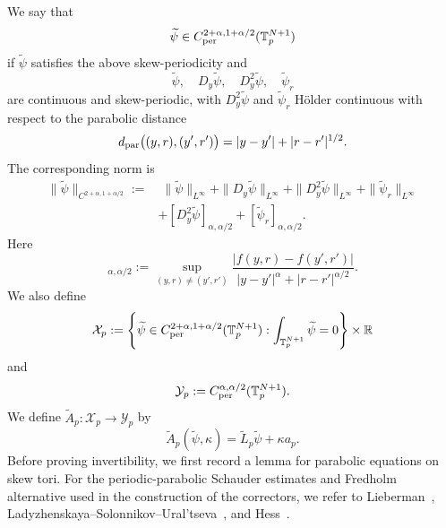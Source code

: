 \documentclass[preprint]{elsarticle}
\numberwithin{equation}{section}
\begin{document}
We say that
$$
\widetilde\psi\in C_{\rm per}^{2+\alpha,1+\alpha/2}(\mathbb T_p^{N+1})
$$
if $\widetilde\psi$ satisfies the above skew-periodicity and
$$
\widetilde\psi,\quad D_y\widetilde\psi,\quad D_y^2\widetilde\psi,\quad \widetilde\psi_r
$$
are continuous and skew-periodic, with $D_y^2\widetilde\psi$ and $\widetilde\psi_r$ Hölder continuous with respect to the parabolic distance
$$
d_{\rm par}\bigl((y,r),(y',r')\bigr)
=
|y-y'|+|r-r'|^{1/2}.
$$
The corresponding norm is
\begin{equation*}
\begin{aligned}
\|\widetilde\psi\|_{C^{2+\alpha,1+\alpha/2}}
:=
&\;
\|\widetilde\psi\|_{L^\infty}
+
\|D_y\widetilde\psi\|_{L^\infty}
+
\|D_y^2\widetilde\psi\|_{L^\infty}
+
\|\widetilde\psi_r\|_{L^\infty}
\\
&+
[D_y^2\widetilde\psi]_{\alpha,\alpha/2}
+
[\widetilde\psi_r]_{\alpha,\alpha/2}.
\end{aligned}
\end{equation*}
Here
\begin{equation*}
[f]_{\alpha,\alpha/2}
:=
\sup_{(y,r)\ne(y',r')}
\frac{|f(y,r)-f(y',r')|}
{|y-y'|^\alpha+|r-r'|^{\alpha/2}}.
\end{equation*}
We also define
\begin{equation*}
\mathcal X_p
:=
\left\{
\widetilde\psi\in
C_{\rm per}^{2+\alpha,1+\alpha/2}(\mathbb T_p^{N+1}):
\int_{\mathbb T_p^{N+1}}\widetilde\psi=0
\right\}
\times\mathbb R
\end{equation*}
and
\begin{equation*}
\mathcal Y_p
:=
C_{\rm per}^{\alpha,\alpha/2}(\mathbb T_p^{N+1}).
\end{equation*}
We define $\widetilde A_p:\mathcal X_p\to\mathcal Y_p$ 
by
\begin{equation*}
\widetilde A_p(\widetilde\psi,\kappa)
=
\widetilde L_p\widetilde\psi+\kappa a_p.
\end{equation*}
Before proving invertibility, we first record a lemma for parabolic equations on skew tori. For the periodic-parabolic Schauder estimates and Fredholm alternative used in the construction of the correctors, we refer to Lieberman~\cite{Lieberman1996}, Ladyzhenskaya--Solonnikov--Ural'tseva~\cite{LadyzhenskayaSolonnikovUraltseva1968}, and Hess~\cite{Hess1991}.
\end{document}
